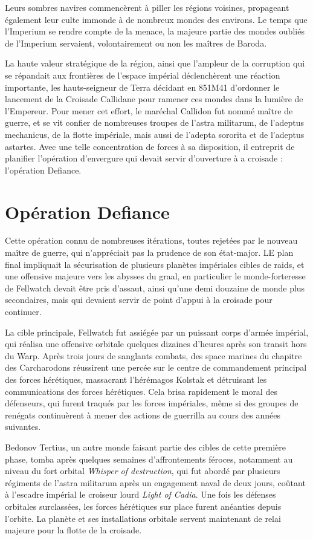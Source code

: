 \documentclass[10pt,a4paper]{book}
\newcommand{\croisade}{Croisade Callidane }
\begin{document}
Leurs sombres navires commencèrent à piller les régions voisines, propageant également leur culte immonde à de nombreux mondes des environs. Le temps que l'Imperium se rendre compte de la menace, la majeure partie des mondes oubliés de l'Imperium servaient, volontairement ou non les maîtres de Baroda.


La haute valeur stratégique de la région, ainsi que l'ampleur de la corruption qui se répandait aux frontières de l'espace impérial déclenchèrent une réaction importante, les hauts-seigneur de Terra décidant en 851M41 d'ordonner le lancement de la \croisade pour ramener ces mondes dans la lumière de l'Empereur. Pour mener cet effort, le maréchal Callidon fut nommé maître de guerre, et se vit confier de nombreuses troupes de l'astra militarum, de l'adeptus mechanicus, de la flotte impériale, mais aussi de l'adepta sororita et de l'adeptus astartes. Avec une telle concentration de forces à sa disposition, il entreprit de planifier l'opération d'envergure qui devait servir d'ouverture à a croisade : l'opération Defiance. 
\section{Opération Defiance}
Cette opération connu de nombreuses itérations, toutes rejetées par le nouveau maître de guerre, qui n'appréciait pas la prudence de son état-major. LE plan final impliquait la sécurisation de plusieurs planètes impériales cibles de raids, et une offensive majeure vers les abysses du graal, en particulier le monde-forteresse de Fellwatch devait être pris d'assaut, ainsi qu'une demi douzaine de monde plus secondaires, mais qui devaient servir de point d'appui à la croisade pour continuer.

La cible principale, Fellwatch fut assiégée par un puissant corps d'armée impérial, qui réalisa une offensive orbitale quelques dizaines d'heures après son transit hors du Warp. Après trois jours de sanglants combats, des space marines du chapitre des Carcharodons réussirent une percée sur le centre de commandement principal des forces hérétiques, massacrant l'hérémagos Kolstak et détruisant les communications des forces hérétiques. Cela brisa rapidement le moral des défenseurs, qui furent traqués par les forces impériales, même si des groupes de renégats continuèrent à mener des actions de guerrilla au cours des années suivantes.

Bedonov Tertius, un autre monde faisant partie des cibles de cette première phase, tomba après quelques semaines d'affrontements féroces, notamment au niveau du fort orbital \emph{Whisper of destruction}, qui fut abordé par plusieurs régiments de l'astra militarum après un engagement naval de deux jours, coûtant à l'escadre impérial le croiseur lourd \emph{Light of Cadia}. Une fois les défenses orbitales surclassées, les forces hérétiques sur place furent anéanties depuis l'orbite. La planète et ses installations orbitale servent maintenant de relai majeure pour la flotte de la croisade.
\end{document}
